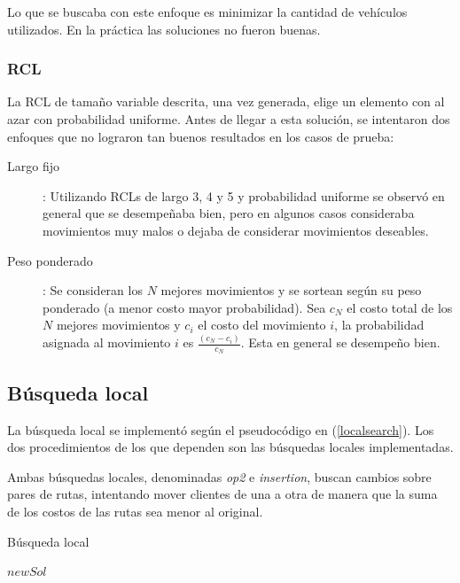 \documentclass{article}
\begin{document}
  Lo que se buscaba con este enfoque es minimizar la cantidad de vehículos utilizados. En la práctica las soluciones no fueron buenas.

  \subsubsection*{RCL}

  La RCL de tamaño variable descrita, una vez generada, elige un elemento con al azar con probabilidad uniforme. Antes de llegar a esta solución, se intentaron dos enfoques que no lograron tan buenos resultados en los casos de prueba:
  \begin{description}
    \item[Largo fijo]: Utilizando RCLs de largo 3, 4 y 5 y probabilidad uniforme se observó en general que se desempeñaba bien, pero en algunos casos consideraba movimientos muy malos o dejaba de considerar movimientos deseables.
    \item[Peso ponderado]: Se consideran los $N$ mejores movimientos y se sortean según su peso ponderado (a menor costo mayor probabilidad). Sea $c_N$ el costo total de los $N$ mejores movimientos y $c_i$ el costo del movimiento $i$, la probabilidad asignada al movimiento $i$ es $\frac{(c_N - c_i)}{c_N}$. Esta en general se desempeño bien.
  \end{description}

  \subsection*{Búsqueda local}

  La búsqueda local se implementó según el pseudocódigo en (\ref{localsearch}). Los dos procedimientos de los que dependen son las búsquedas locales implementadas.

  Ambas búsquedas locales, denominadas {\it op2} e {\it insertion}, buscan cambios sobre pares de rutas, intentando mover clientes de una a otra de manera que la suma de los costos de las rutas sea menor al original.

  \begin{algorithm}
    \caption{Búsqueda local}
    \label{localsearch}
    \begin{algorithmic}
        \State \Return $newSol$
      \EndFunction
    \end{algorithmic}
  \end{algorithm}
\end{document}

